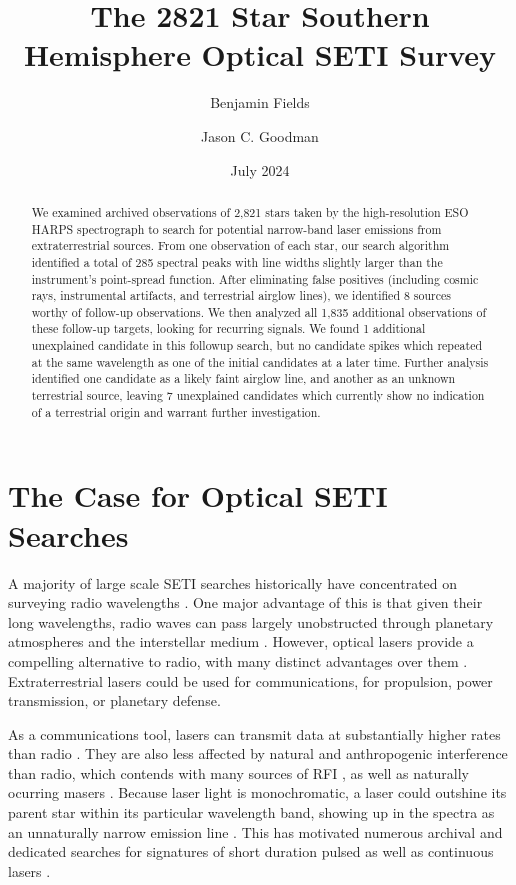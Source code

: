 \documentclass[linenumbers]{aastex631}
\begin{document}
\title{The 2821 Star Southern Hemisphere Optical SETI Survey}
\author{Benjamin Fields}
\author[0000-0002-6755-2710]{Jason C. Goodman}

\date{July 2024}

\begin{abstract}
We examined archived observations of 2,821 stars taken by the high-resolution ESO HARPS spectrograph to search for potential narrow-band laser emissions from extraterrestrial sources. From one observation of each star, our search algorithm identified a total of 285 spectral peaks with line widths slightly larger than the instrument's point-spread function.  After eliminating  false positives (including cosmic rays, instrumental artifacts, and terrestrial airglow lines), we identified 8 sources worthy of follow-up observations. We then analyzed all 1,835 additional observations of these follow-up targets, looking for recurring signals. We found 1 additional unexplained candidate in this followup search, but no candidate spikes which repeated at the same wavelength as one of the initial candidates at a later time.  Further analysis identified one candidate as a likely faint airglow line, and another as an unknown terrestrial source, leaving 7 unexplained candidates which currently show no indication of a terrestrial origin and warrant further investigation.
\end{abstract}

\section{The Case for Optical SETI Searches}
A majority of large scale SETI searches historically have concentrated on surveying radio wavelengths \citep{Gray_2017,OZMAII,LAMPTON1992189,Price_2020,PeterMa,Wright_2018}. One major advantage of this is that given their long wavelengths, radio waves can pass largely unobstructed through planetary atmospheres and the interstellar medium \citep{COCCONI_MORRISON_1959}. However, optical lasers provide a compelling alternative to radio, with many distinct advantages over them \citep{caseforopticalseti}. Extraterrestrial lasers could be used for communications, for propulsion, power transmission, or planetary defense.  

As a communications tool, lasers can transmit data at substantially higher rates than radio \citep{Tellis_2017,Kingsley}. They are also less affected by natural and anthropogenic interference than radio, which contends with many sources of RFI \citep{RFIpaper}, as well as naturally ocurring masers \citep{méndez2024arecibowowiastrophysical}. Because laser light is monochromatic, a laser could outshine its parent star within its particular wavelength band, showing up in the spectra as an unnaturally narrow emission line \citep{TOWNES_SCHWARTZ_1961,STANTON201992}. This has motivated numerous archival and dedicated searches for signatures of short duration pulsed as well as continuous lasers \citep{Tellis_2017,Lipman_2019,Howard_2004,Shelley_Wright,Zuckerman_2023,Reines_2002,Maire_2019,Marcy_2021}.
\end{document}
